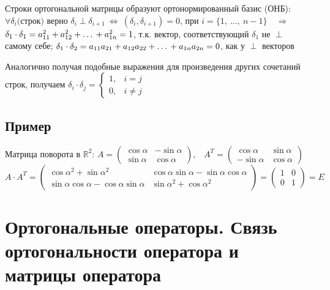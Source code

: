 \documentclass[12pt]{article}
\begin{document}
Строки ортогональной матрицы образуют ортонормированный базис (ОНБ):\\
\hspace*{36pt} $\forall \delta_i\textrm{(строк)}$ верно
$\delta_i \perp \delta_{i+1} \ \Leftrightarrow \ (\delta_i, \delta_{i+1}) = 0$,
при $i = \{1,\ \dots,\ n-1\} \quad \Rightarrow$\\ \hspace*{36pt}
$\delta_1 \cdot \delta_1 = a_{11}^2 + a_{12}^2 +\textrm{\dots}+ a_{1n}^2 = 1$,
т.к. вектор, соответствующий $\delta_1$ не $\perp$ самому себе; \hspace*{36pt}
$\delta_1 \cdot \delta_2 = a_{11}a_{21} + a_{12}a_{22} +\textrm{\dots}+ a_{1n}a_{2n} = 0$,
как у $\perp$ векторов

Аналогично получая подобные выражения для произведения других сочетаний строк, получаем
$\delta_i \cdot \delta_j =
    \begin{cases}
        1, & i = j    \\
        0, & i \neq j
    \end{cases}$
\subsection*{Пример}
\hspace{36pt}
Матрица поворота в $\mathbb{R}^2$:
$ A =
    \begin{pmatrix}
        \cos{\alpha} & -\sin{\alpha} \\
        \sin{\alpha} & \cos{\alpha}
    \end{pmatrix}
    \textrm{,}\quad A^T =
    \begin{pmatrix}
        \cos{\alpha}  & \sin{\alpha} \\
        -\sin{\alpha} & \cos{\alpha}
    \end{pmatrix}$\\
\[
    A \cdot A^T =
    \begin{pmatrix}
        \cos{\alpha}^2 + \sin{\alpha}^2                     &
        \cos{\alpha}\sin{\alpha} - \sin{\alpha}\cos{\alpha}   \\
        \sin{\alpha}\cos{\alpha} - \cos{\alpha}\sin{\alpha} &
        \sin{\alpha}^2 + \cos{\alpha}^2
    \end{pmatrix}
    =
    \begin{pmatrix}
        1 & 0 \\
        0 & 1
    \end{pmatrix}
    = E
\]
\section{Ортогональные операторы. Связь ортогональности оператора и матрицы оператора}
\end{document}
